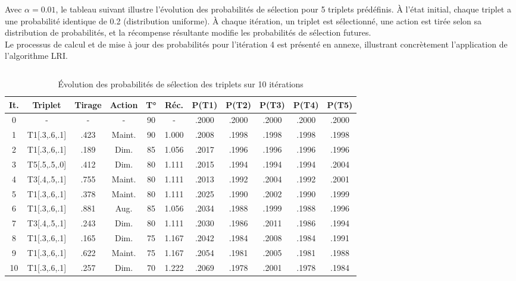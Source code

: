 
Avec $\alpha = 0.01$, le tableau suivant illustre l'évolution des probabilités de sélection pour 5 triplets prédéfinis. À l'état initial, chaque triplet a une probabilité identique de 0.2 (distribution uniforme). À chaque itération, un triplet est sélectionné, une action est tirée selon sa distribution de probabilités, et la récompense résultante modifie les probabilités de sélection futures.\\

Le processus de calcul et de mise à jour des probabilités pour l'itération 4 est présenté en annexe, illustrant concrètement l'application de l'algorithme LRI.
\begin{lstlisting}[style=mystyle, caption={Détail de l'itération 4 dans l'algorithme LRI}, escapechar=|]

\end{lstlisting}




\begin{table}[h]
\centering
\scriptsize
\setlength{\tabcolsep}{1.5pt}
\begin{tabular}{|c|c|c|c|c|c|c|c|c|c|c|}
\hline
\textbf{It.} & \textbf{Triplet} & \textbf{Tirage} & \textbf{Action} & \textbf{T°} & \textbf{Réc.} & \textbf{P(T1)} & \textbf{P(T2)} & \textbf{P(T3)} & \textbf{P(T4)} & \textbf{P(T5)} \\
\hline
0 & - & - & - & 90 & - & .2000 & .2000 & .2000 & .2000 & .2000 \\
\hline
1 & T1[.3,.6,.1] & .423 & Maint. & 90 & 1.000 & .2008 & .1998 & .1998 & .1998 & .1998 \\
\hline
2 & T1[.3,.6,.1] & .189 & Dim. & 85 & 1.056 & .2017 & .1996 & .1996 & .1996 & .1996 \\
\hline
3 & T5[.5,.5,.0] & .412 & Dim. & 80 & 1.111 & .2015 & .1994 & .1994 & .1994 & .2004 \\
\hline
4 & T3[.4,.5,.1] & .755 & Maint. & 80 & 1.111 & .2013 & .1992 & .2004 & .1992 & .2001 \\
\hline
5 & T1[.3,.6,.1] & .378 & Maint. & 80 & 1.111 & .2025 & .1990 & .2002 & .1990 & .1999 \\
\hline
6 & T1[.3,.6,.1] & .881 & Aug. & 85 & 1.056 & .2034 & .1988 & .1999 & .1988 & .1996 \\
\hline
7 & T3[.4,.5,.1] & .243 & Dim. & 80 & 1.111 & .2030 & .1986 & .2011 & .1986 & .1994 \\
\hline
8 & T1[.3,.6,.1] & .165 & Dim. & 75 & 1.167 & .2042 & .1984 & .2008 & .1984 & .1991 \\
\hline
9 & T1[.3,.6,.1] & .622 & Maint. & 75 & 1.167 & .2054 & .1981 & .2005 & .1981 & .1988 \\
\hline
10 & T1[.3,.6,.1] & .257 & Dim. & 70 & 1.222 & .2069 & .1978 & .2001 & .1978 & .1984 \\
\hline
\end{tabular}
\caption{Évolution des probabilités de sélection des triplets sur 10 itérations}
\label{tab:exemple_apprentissage}
\end{table}


